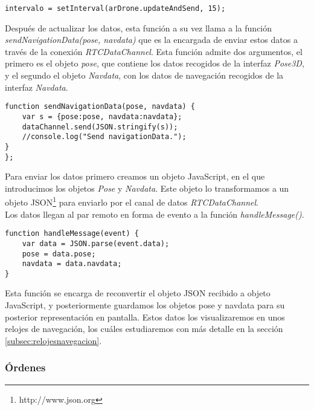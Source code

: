 \begin{lstlisting}[caption=Intervalo actualización y envío de datos de los sensores.]
intervalo = setInterval(arDrone.updateAndSend, 15);
\end{lstlisting}

Después de actualizar los datos, esta función a su vez llama a la función \emph{sendNavigationData(pose, navdata)} que es la encargada de enviar estos datos a través de la conexión \emph{RTCDataChannel}. Esta función admite dos argumentos, el primero es el objeto \emph{pose}, que contiene los datos recogidos de la interfaz \emph{Pose3D}, y el segundo el objeto \emph{Navdata}, con los datos de navegación recogidos de la interfaz \emph{Navdata}.\\

\begin{lstlisting}[caption=Envio de los datos de los sensores en el par local.]
function sendNavigationData(pose, navdata) {
	var s = {pose:pose, navdata:navdata};
	dataChannel.send(JSON.stringify(s));
	//console.log("Send navigationData.");
}
};\end{lstlisting}

Para enviar los datos primero creamos un objeto JavaScript, en el que introducimos los objetos \emph{Pose} y \emph{Navdata}. Este objeto lo transformamos a un objeto JSON\footnote{http://www.json.org} para enviarlo por el canal de datos \emph{RTCDataChannel}.\\

Los datos llegan al par remoto en forma de evento a la función \emph{handleMessage()}.\\

\begin{lstlisting}[caption=Manejo de los datos de los sensores en el par remoto.]
function handleMessage(event) {
    var data = JSON.parse(event.data);
    pose = data.pose;
    navdata = data.navdata;
}
\end{lstlisting}

Esta función se encarga de reconvertir el objeto JSON recibido a objeto JavaScript, y posteriormente guardamos los objetos pose y navdata para su posterior representación en pantalla. Estos datos los visualizaremos en unos relojes de navegación, los cuáles estudiaremos con más detalle en la sección \ref{subsec:relojesnavegacion}.\\


\subsubsection{Órdenes}\label{subsec:ordenes}

